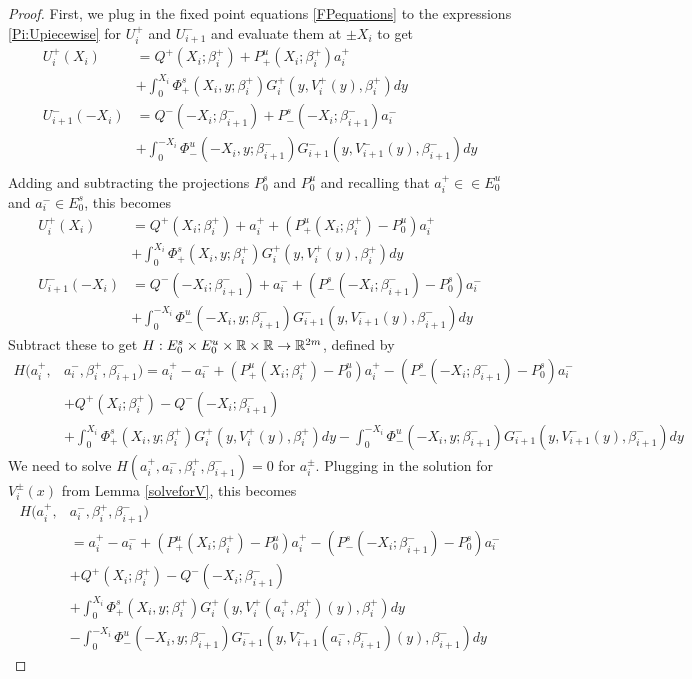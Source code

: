 \documentclass[thesis.tex]{subfiles}
\begin{document}
\begin{lemma}
\begin{proof}
First, we plug in the fixed point equations \eqref{FPequations} to the expressions \eqref{Pi:Upiecewise} for $U_i^+$ and $U_{i+1}^-$ and evaluate them at $\pm X_i$ to get
\begin{align*}
U_i^+(X_i) &= Q^+(X_i; \beta_i^+) + P^u_+(X_i; \beta_i^+) a_i^+ \\
&+ \int_0^{X_i} \Phi_+^s(X_i, y; \beta_i^+) G_i^+(y, V_i^+(y),\beta_i^+)dy \\ 
U_{i+1}^-(-X_i) &= Q^-(-X_i; \beta_{i+1}^-) + P^s_-(-X_i; \beta_{i+1}^-) a_i^- \\
&+ \int_0^{-X_i} \Phi_-^u(-X_i, y; \beta_{i+1}^-) G_{i+1}^-(y, V_{i+1}^-(y),\beta_{i+1}^-)dy \\
\end{align*}
Adding and subtracting the projections $P_0^s$ and $P_0^u$ and recalling that $a_i^+ \in \in E_0^u$ and $a_i^- \in E_0^s$, this becomes
\begin{align*}
U_i^+(X_i) &= Q^+(X_i; \beta_i^+) + a_i^+ + (P^u_+(X_i; \beta_i^+) -  P^u_0)a_i^+ \\
&+ \int_0^{X_i} \Phi_+^s(X_i, y; \beta_i^+) G_i^+(y, V_i^+(y),\beta_i^+)dy \\ 
U_{i+1}^-(-X_i) &= Q^-(-X_i; \beta_{i+1}^-) + a_i^- + (P^s_-(-X_i; \beta_{i+1}^-) - P^s_0) a_i^- \\ 
&+ \int_0^{-X_i} \Phi_-^u(-X_i, y; \beta_{i+1}^-) G_{i+1}^-(y, V_{i+1}^-(y),\beta_{i+1}^-)dy
\end{align*}
Subtract these to get $H: E_0^s \times E_0^u \times {\mathbb R} \times {\mathbb R} \rightarrow {\mathbb R}^{2m}$, defined by
\begin{align*}
H(a_i^+, &a_i^-, \beta_i^+, \beta_{i+1}^-) 
= a_i^+ - a_i^- + (P^u_+(X_i; \beta_i^+) -  P^u_0)a_i^+ - (P^s_-(-X_i; \beta_{i+1}^-) - P^s_0) a_i^-  \\
&+ Q^+(X_i; \beta_i^+) - Q^-(-X_i; \beta_{i+1}^-)\\
&+ \int_0^{X_i} \Phi_+^s(X_i, y; \beta_i^+) G_i^+(y, V_i^+(y),\beta_i^+)dy
- \int_0^{-X_i} \Phi_-^u(-X_i, y; \beta_{i+1}^-) G_{i+1}^-(y, V_{i+1}^-(y),\beta_{i+1}^-)dy 
\end{align*}
We need to solve $H(a_i^+, a_i^-, \beta_i^+, \beta_{i+1}^-) = 0$ for $a_i^\pm$. Plugging in the solution for $V_i^\pm(x)$ from Lemma \ref{solveforV}, this becomes
\begin{align*}
H(a_i^+, &a_i^-, \beta_i^+, \beta_{i+1}^-) \\
&= a_i^+ - a_i^- + (P^u_+(X_i; \beta_i^+) -  P^u_0)a_i^+ - (P^s_-(-X_i; \beta_{i+1}^-) - P^s_0) a_i^-  \\
&+ Q^+(X_i; \beta_i^+) - Q^-(-X_i; \beta_{i+1}^-) \\
&+ \int_0^{X_i} \Phi_+^s(X_i, y; \beta_i^+) G_i^+(y, V_i^+(a_i^+, \beta_i^+)(y),\beta_i^+)dy \\
&- \int_0^{-X_i} \Phi_-^u(-X_i, y; \beta_{i+1}^-) G_{i+1}^-(y, V_{i+1}^-(a_i^-, \beta_{i+1}^-)(y),\beta_{i+1}^-)dy 
\end{align*}


\end{proof}
\end{lemma}
\end{document}
